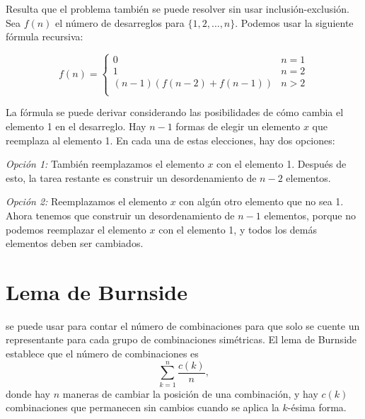 Resulta que el problema también se puede resolver
sin usar inclusión-exclusión.
Sea $f(n)$ el número de desarreglos
para $\{1,2,\ldots,n\}$. Podemos usar la siguiente
fórmula recursiva:

\begin{equation*}
    f(n) = \begin{cases}
               0               & n = 1\\
               1               & n = 2\\
               (n-1)(f(n-2) + f(n-1)) & n>2 \\
           \end{cases}
\end{equation*}

La fórmula se puede derivar considerando
las posibilidades de cómo cambia el elemento 1
en el desarreglo.
Hay $n-1$ formas de elegir un elemento $x$
que reemplaza al elemento 1.
En cada una de estas elecciones, hay dos opciones:


\textit{Opción 1:} También reemplazamos el elemento $x$
con el elemento 1.
Después de esto, la tarea restante es construir
un desordenamiento de $n-2$ elementos.

\textit{Opción 2:} Reemplazamos el elemento $x$
con algún otro elemento que no sea 1.
Ahora tenemos que construir un desordenamiento
de $n-1$ elementos, porque no podemos reemplazar
el elemento $x$ con el elemento 1, y todos los demás
elementos deben ser cambiados.

\section{Lema de Burnside}


se puede usar para contar
el número de combinaciones para que
solo se cuente un representante
para cada grupo de combinaciones simétricas.
El lema de Burnside establece que el número de
combinaciones es
\[\sum_{k=1}^n \frac{c(k)}{n},\]
donde hay $n$ maneras de cambiar la
posición de una combinación,
y hay $c(k)$ combinaciones que
permanecen sin cambios cuando se aplica la $k$-ésima forma.

